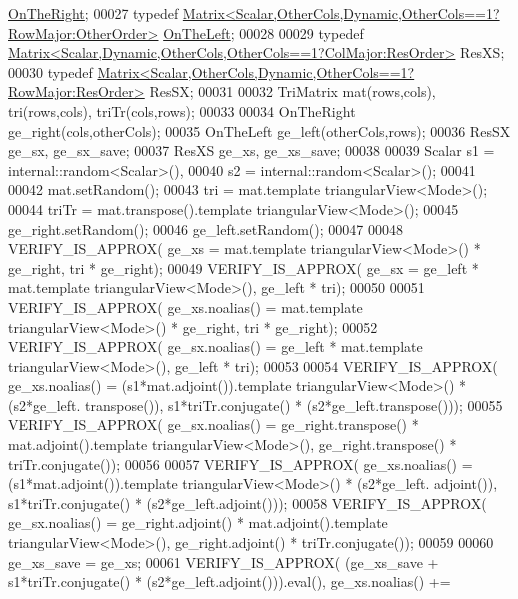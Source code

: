 \begin{DoxyCode}
       \hyperlink{group__enums_ggac22de43beeac7a78b384f99bed5cee0ba99dc75d8e00b6c3a5bdc31940f47492b}{OnTheRight};
00027   \textcolor{keyword}{typedef} \hyperlink{group___core___module_class_eigen_1_1_matrix}{Matrix<Scalar,OtherCols,Dynamic,OtherCols==1?RowMajor:OtherOrder>}
       \hyperlink{group__enums_ggac22de43beeac7a78b384f99bed5cee0ba129609b3bdf23b071f5f86cf2f995ec4}{OnTheLeft};
00028   
00029   \textcolor{keyword}{typedef} \hyperlink{group___core___module_class_eigen_1_1_matrix}{Matrix<Scalar,Dynamic,OtherCols,OtherCols==1?ColMajor:ResOrder>}
       ResXS;
00030   \textcolor{keyword}{typedef} \hyperlink{group___core___module_class_eigen_1_1_matrix}{Matrix<Scalar,OtherCols,Dynamic,OtherCols==1?RowMajor:ResOrder>}
       ResSX;
00031 
00032   TriMatrix  mat(rows,cols), tri(rows,cols), triTr(cols,rows);
00033   
00034   OnTheRight  ge\_right(cols,otherCols);
00035   OnTheLeft   ge\_left(otherCols,rows);
00036   ResSX       ge\_sx, ge\_sx\_save;
00037   ResXS       ge\_xs, ge\_xs\_save;
00038 
00039   Scalar s1 = internal::random<Scalar>(),
00040          s2 = internal::random<Scalar>();
00041 
00042   mat.setRandom();
00043   tri = mat.template triangularView<Mode>();
00044   triTr = mat.transpose().template triangularView<Mode>();
00045   ge\_right.setRandom();
00046   ge\_left.setRandom();
00047 
00048   VERIFY\_IS\_APPROX( ge\_xs = mat.template triangularView<Mode>() * ge\_right, tri * ge\_right);
00049   VERIFY\_IS\_APPROX( ge\_sx = ge\_left * mat.template triangularView<Mode>(), ge\_left * tri);
00050   
00051   VERIFY\_IS\_APPROX( ge\_xs.noalias() = mat.template triangularView<Mode>() * ge\_right, tri * ge\_right);
00052   VERIFY\_IS\_APPROX( ge\_sx.noalias() = ge\_left * mat.template triangularView<Mode>(), ge\_left * tri);
00053 
00054   VERIFY\_IS\_APPROX( ge\_xs.noalias() = (s1*mat.adjoint()).\textcolor{keyword}{template} triangularView<Mode>() * (s2*ge\_left.
      transpose()), s1*triTr.conjugate() * (s2*ge\_left.transpose()));
00055   VERIFY\_IS\_APPROX( ge\_sx.noalias() = ge\_right.transpose() * mat.adjoint().template triangularView<Mode>(),
       ge\_right.transpose() * triTr.conjugate());
00056   
00057   VERIFY\_IS\_APPROX( ge\_xs.noalias() = (s1*mat.adjoint()).\textcolor{keyword}{template} triangularView<Mode>() * (s2*ge\_left.
      adjoint()), s1*triTr.conjugate() * (s2*ge\_left.adjoint()));
00058   VERIFY\_IS\_APPROX( ge\_sx.noalias() = ge\_right.adjoint() * mat.adjoint().template triangularView<Mode>(), 
      ge\_right.adjoint() * triTr.conjugate());
00059 
00060   ge\_xs\_save = ge\_xs;
00061   VERIFY\_IS\_APPROX( (ge\_xs\_save + s1*triTr.conjugate() * (s2*ge\_left.adjoint())).eval(), ge\_xs.noalias() +=

\end{DoxyCode}
